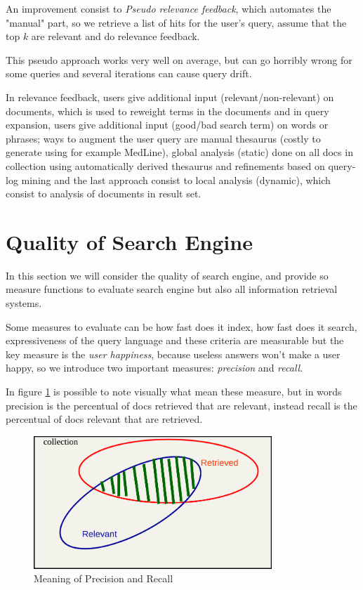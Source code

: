 An improvement consist to \emph{Pseudo relevance feedback}, which
automates the "manual" part, so we retrieve a list of hits for the
user's query, assume that the top $k$ are relevant and do relevance feedback.

This pseudo approach works very well on average, but can go horribly wrong
for some queries and several iterations can cause query drift.

In relevance feedback, users give additional input (relevant/non-relevant)
on documents, which is used to reweight terms in the documents and 
in query expansion, users give additional input (good/bad search term)
on words or phrases; ways to augment the user query are manual thesaurus
(costly to generate using for example MedLine), global analysis (static)
done on all docs in collection using automatically derived thesaurus and 
refinements based on query-log mining and the last approach consist to
local analysis (dynamic), which consist to analysis of documents in result set.

\section{Quality of Search Engine}
In this section we will consider the quality of search engine, and provide
so measure functions to evaluate search engine but also all information
retrieval systems.

Some measures to evaluate can be how fast does it index, how fast does
it search, expressiveness of the query language and these criteria are
measurable but the key measure is the \emph{user happiness}, because
useless answers won't make a user happy, so we introduce two important 
measures: \emph{precision} and \emph{recall}.

In figure \ref{img:precisionRecall} is possible to note visually what 
mean these measure, but in words precision is the percentual
of docs retrieved that are relevant, instead recall is the 
percentual of docs relevant that are retrieved.

\begin{figure}
	\includegraphics[width=0.8\textwidth]{Images/precisionRecall}
	\caption{Meaning of Precision and Recall}
	\label{img:precisionRecall}
\end{figure}

